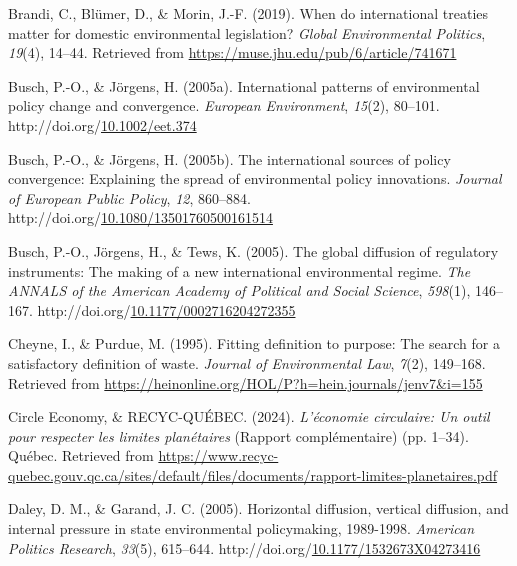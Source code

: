 \documentclass[12pt]{ulaval}
\newenvironment{CSLReferences}%
  {}%
  {\par}
\begin{document}
\begin{CSLReferences}{1}{0}
Brandi, C., Blümer, D., \& Morin, J.-F. (2019). When do international treaties matter for domestic environmental legislation? \emph{Global Environmental Politics}, \emph{19}(4), 14--44. Retrieved from \url{https://muse.jhu.edu/pub/6/article/741671}

Busch, P.-O., \& Jörgens, H. (2005a). International patterns of environmental policy change and convergence. \emph{European Environment}, \emph{15}(2), 80--101. http://doi.org/\href{https://doi.org/10.1002/eet.374}{10.1002/eet.374}

Busch, P.-O., \& Jörgens, H. (2005b). The international sources of policy convergence: Explaining the spread of environmental policy innovations. \emph{Journal of European Public Policy}, \emph{12}, 860--884. http://doi.org/\href{https://doi.org/10.1080/13501760500161514}{10.1080/13501760500161514}

Busch, P.-O., Jörgens, H., \& Tews, K. (2005). The global diffusion of regulatory instruments: The making of a new international environmental regime. \emph{The {ANNALS} of the American Academy of Political and Social Science}, \emph{598}(1), 146--167. http://doi.org/\href{https://doi.org/10.1177/0002716204272355}{10.1177/0002716204272355}

Cheyne, I., \& Purdue, M. (1995). Fitting definition to purpose: The search for a satisfactory definition of waste. \emph{Journal of Environmental Law}, \emph{7}(2), 149--168. Retrieved from \url{https://heinonline.org/HOL/P?h=hein.journals/jenv7&i=155}

Circle Economy, \& RECYC-QUÉBEC. (2024). \emph{L'économie circulaire: Un outil pour respecter les limites planétaires} (Rapport complémentaire) (pp. 1--34). Québec. Retrieved from \url{https://www.recyc-quebec.gouv.qc.ca/sites/default/files/documents/rapport-limites-planetaires.pdf}

Daley, D. M., \& Garand, J. C. (2005). Horizontal diffusion, vertical diffusion, and internal pressure in state environmental policymaking, 1989-1998. \emph{American Politics Research}, \emph{33}(5), 615--644. http://doi.org/\href{https://doi.org/10.1177/1532673X04273416}{10.1177/1532673X04273416}


\end{CSLReferences}
\end{document}
